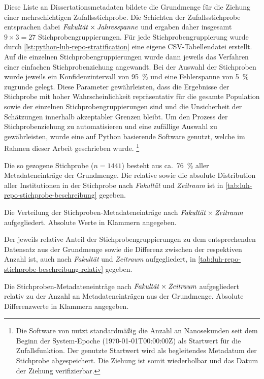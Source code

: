 Diese Liste an Dissertationsmetadaten bildete die Grundmenge für die Ziehung einer mehrschichtigen Zufallsstichprobe.
Die Schichten der Zufallsstichprobe entsprachen dabei $\text{\textit{Fakultät}}\times\text{\textit{Jahresspanne}}$ und ergaben daher insgesamt $\num{9}\times\num{3}=\num{27}$ Stichprobengruppierungen.
Für jede Stichprobengruppierung wurde durch \cref{lst:python-luh-repo-stratification} eine eigene CSV-Tabellendatei erstellt.
Auf die einzelnen Stichprobengruppierungen wurde dann jeweils das Verfahren einer einfachen Stichprobenziehung angewandt.
Bei der Auswahl der Stichproben wurde jeweils ein Konfidenzintervall von \SI{95}{\percent} und eine Fehlerspanne von \SI{5}{\percent} zugrunde gelegt.
Diese Parameter gewährleisten, dass die Ergebnisse der Stichprobe mit hoher Wahrscheinlichkeit repräsentativ für die gesamte Population sowie der einzelnen Stichprobengruppierungen sind und die Unsicherheit der Schätzungen innerhalb akzeptabler Grenzen bleibt.
Um den Prozess der Stichprobenziehung zu automatisieren und eine zufällige Auswahl zu gewährleisten, wurde eine auf Python basierende Software \autocite{Krassnig2024-csv} genutzt, welche im Rahmen dieser Arbeit geschrieben wurde.%
\footnote{%
Die Software von \citeauthor{Krassnig2024-csv} \autocite{Krassnig2024-csv} nutzt standardmäßig die Anzahl an Nanosekunden seit dem Beginn der System-Epoche (1970-01-01T00:00:00Z) als Startwert für die Zufallsfunktion.
Der genutzte Startwert wird als begleitendes Metadatum der Stichprobe abgespeichert.
Die Ziehung ist somit wiederholbar und das Datum der Ziehung verifizierbar.} 

Die so gezogene Stichprobe ($n=1441$) besteht aus ca.~\SI{76}{\percent} aller Metadateneinträge der Grundmenge.
Die relative sowie die absolute Distribution aller Institutionen in der Stichprobe nach \textit{Fakultät} und \textit{Zeitraum} ist in \cref{tab:luh-repo-stichprobe-beschreibung} gegeben.
\begin{table}[!htbp]
	\caption{Die Verteilung der Stichproben-Metadateneinträge nach $\text{\textit{Fakultät}}\times\text{\textit{Zeitraum}}$ aufgegliedert.
    Absolute Werte in Klammern angegeben.}
    
	\label{tab:luh-repo-stichprobe-beschreibung}
\end{table}
Der jeweils relative Anteil der Stichprobengruppierungen zu dem entsprechenden Datensatz aus der Grundmenge sowie die Differenz zwischen der respektiven Anzahl ist, auch nach \textit{Fakultät} und \textit{Zeitraum} aufgegliedert, in \cref{tab:luh-repo-stichprobe-beschreibung-relativ} gegeben.
\begin{table}[!htbp]
	\caption{Die Stichproben-Metadateneinträge nach $\text{\textit{Fakultät}}\times\text{\textit{Zeitraum}}$ aufgegliedert relativ zu der Anzahl an Metadateneinträgen aus der Grundmenge.
    Absolute Differenzwerte in Klammern angegeben.}
    
	\label{tab:luh-repo-stichprobe-beschreibung-relativ}
\end{table}

